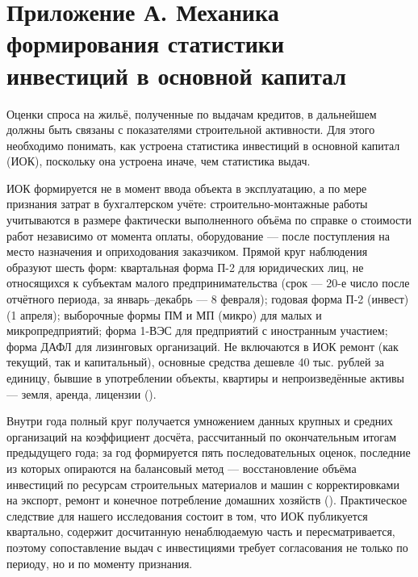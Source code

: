 \documentclass[
  russian,
  11pt,
]{article}
\begin{document}
\section{Приложение А. Механика формирования статистики инвестиций в
основной
капитал}\label{ux43fux440ux438ux43bux43eux436ux435ux43dux438ux435-ux430.-ux43cux435ux445ux430ux43dux438ux43aux430-ux444ux43eux440ux43cux438ux440ux43eux432ux430ux43dux438ux44f-ux441ux442ux430ux442ux438ux441ux442ux438ux43aux438-ux438ux43dux432ux435ux441ux442ux438ux446ux438ux439-ux432-ux43eux441ux43dux43eux432ux43dux43eux439-ux43aux430ux43fux438ux442ux430ux43b}

Оценки спроса на жильё, полученные по выдачам кредитов, в дальнейшем
должны быть связаны с показателями строительной активности. Для этого
необходимо понимать, как устроена статистика инвестиций в основной
капитал (ИОК), поскольку она устроена иначе, чем статистика выдач.

ИОК формируется не в момент ввода объекта в эксплуатацию, а по мере
признания затрат в бухгалтерском учёте: строительно-монтажные работы
учитываются в размере фактически выполненного объёма по справке о
стоимости работ независимо от момента оплаты, оборудование --- после
поступления на место назначения и оприходования заказчиком. Прямой круг
наблюдения образуют шесть форм: квартальная форма П-2 для юридических
лиц, не относящихся к субъектам малого предпринимательства (срок ---
20-е число после отчётного периода, за январь--декабрь --- 8 февраля);
годовая форма П-2 (инвест) (1 апреля); выборочные формы ПМ и МП (микро)
для малых и микропредприятий; форма 1-ВЭС для предприятий с иностранным
участием; форма ДАФЛ для лизинговых организаций. Не включаются в ИОК
ремонт (как текущий, так и капитальный), основные средства дешевле 40
тыс. рублей за единицу, бывшие в употреблении объекты, квартиры и
непроизведённые активы --- земля, аренда, лицензии
().

Внутри года полный круг получается умножением данных крупных и средних
организаций на коэффициент досчёта, рассчитанный по окончательным итогам
предыдущего года; за год формируется пять последовательных оценок,
последние из которых опираются на балансовый метод --- восстановление
объёма инвестиций по ресурсам строительных материалов и машин с
корректировками на экспорт, ремонт и конечное потребление домашних
хозяйств (). Практическое
следствие для нашего исследования состоит в том, что ИОК публикуется
квартально, содержит досчитанную ненаблюдаемую часть и пересматривается,
поэтому сопоставление выдач с инвестициями требует согласования не
только по периоду, но и по моменту признания.
\end{document}
